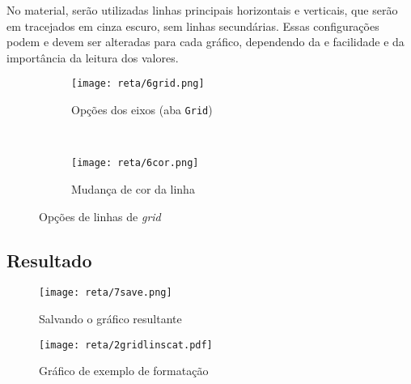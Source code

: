     No material, serão utilizadas linhas principais horizontais e verticais, que serão em tracejados em cinza escuro, sem linhas secundárias. Essas configurações podem e devem ser alteradas para cada gráfico, dependendo da e facilidade e da importância da leitura dos valores.

    \begin{figure}[htbp]
        \centering
        \begin{subfigure}{0.45\textwidth}
            \centering
            \texttt{[image: reta/6grid.png]}

            \caption{Opções dos eixos (aba \texttt{Grid})}
            \label{fig:reta:grid}
        \end{subfigure}
        ~
        \begin{subfigure}{0.45\textwidth}
            \centering
            \texttt{[image: reta/6cor.png]}

            \caption{Mudança de cor da linha}
            \label{fig:reta:gridcor}
        \end{subfigure}
        \caption{Opções de linhas de \textit{grid}}
        \label{fig:reta:opcoes_eixo}
    \end{figure}


\subsection{Resultado}

    \begin{figure}[htbp]
        \centering
        \texttt{[image: reta/7save.png]}

        \caption{Salvando o gráfico resultante}
        \label{fig:reta:salvar}
    \end{figure}

    \begin{figure}[htbp]
        \centering
        \texttt{[image: reta/2gridlinscat.pdf]}

        \caption{Gráfico de exemplo de formatação}
        \label{fig:reta:gridlinscat}
    \end{figure}

